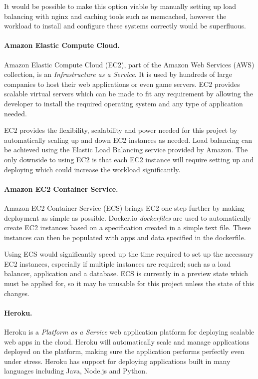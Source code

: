 It would be possible to make this option viable by manually setting up load balancing with nginx and caching tools such as memcached, however the workload to install and configure these systems correctly would be superfluous.\cite{nginxloadbalancing,memcached}

\paragraph{Amazon Elastic Compute Cloud.}
Amazon Elastic Compute Cloud (EC2), part of the Amazon Web Services (AWS) collection, is an \emph{Infrastructure as a Service}.\cite{awsec2} It is used by hundreds of large companies to host their web applications or even game servers. EC2 provides scalable virtual servers which can be made to fit any requirement by allowing the developer to install the required operating system and any type of application needed.

EC2 provides the flexibility, scalability and power needed for this project by automatically scaling up and down EC2 instances as needed.\cite{awsec2} Load balancing can be achieved using the Elastic Load Balancing service provided by Amazon.\cite{elasticloadbalancing} The only downside to using EC2 is that each EC2 instance will require setting up and deploying which could increase the workload significantly.

\paragraph{Amazon EC2 Container Service.}
Amazon EC2 Container Service (ECS) brings EC2 one step further by making deployment as simple as possible. Docker.io \emph{dockerfiles} are used to automatically create EC2 instances based on a specification created in a simple text file.\cite{awsecs} These instances can then be populated with apps and data specified in the dockerfile.\cite{dockerfile}

Using ECS would significantly speed up the time required to set up the necessary EC2 instances, especially if multiple instances are required; such as a load balancer, application and a database. ECS is currently in a preview state which must be applied for, so it may be unusable for this project unless the state of this changes.

\paragraph{Heroku.}
Heroku is a \emph{Platform as a Service} web application platform for deploying scalable web apps in the cloud. Heroku will automatically scale and manage applications deployed on the platform, making sure the application performs perfectly even under stress.\cite{heroku} Heroku has support for deploying applications built in many languages including Java, Node.js and Python.

